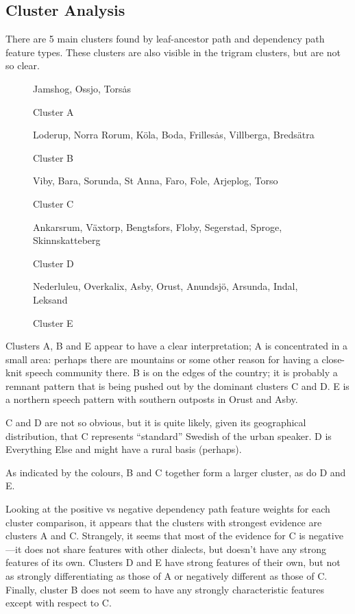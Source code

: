 \subsection{Cluster Analysis}

There are 5 main clusters found by leaf-ancestor path and dependency
path feature types. These clusters are also visible in the trigram
clusters, but are not so clear.

\begin{figure}
  Jamshog, Ossjo, Tors\.as
\label{cluster-a}
\caption{Cluster A}
\end{figure}

\begin{figure}
  Loderup, Norra Rorum, K\"ola, Boda, Frilles\.as, Villberga,
  Breds\"atra
\label{cluster-b}
\caption{Cluster B}
\end{figure}

\begin{figure}
  Viby, Bara, Sorunda, St Anna, Faro, Fole, Arjeplog, Torso
\label{cluster-c}
\caption{Cluster C}
\end{figure}

\begin{figure}
  Ankarsrum, V\"axtorp, Bengtsfors, Floby, Segerstad, Sproge,
  Skinnskatteberg
\label{cluster-d}
\caption{Cluster D}
\end{figure}

\begin{figure}
  Nederluleu, Overkalix, Asby, Orust, Anundsj\"o, Arsunda, Indal,
  Leksand
\label{cluster-e}
\caption{Cluster E}
\end{figure}

Clusters A, B and E appear to have a clear interpretation; A is
concentrated in a small area: perhaps there are mountains or some
other reason for having a close-knit speech community there. B is on
the edges of the country; it is probably a remnant pattern that is
being pushed out by the dominant clusters C and D. E is a
northern speech pattern with southern outposts in Orust and Asby.

C and D are not so obvious, but it is quite likely, given its
geographical distribution, that C represents
``standard'' Swedish of the urban speaker. D is Everything Else and
might have a rural basis (perhaps).

As indicated by the colours, B and C together form a larger cluster,
as do D and E.

Looking at the positive vs negative dependency path feature weights
for each cluster comparison, it appears that the clusters with
strongest evidence are clusters A and C. Strangely, it seems that most
of the evidence for C is negative---it does not share features with
other dialects, but doesn't have any strong features of its own.
Clusters D and E have strong features of their own, but not as
strongly differentiating as those of A or negatively different as
those of C. Finally, cluster B does not seem to have any strongly
characteristic features except with respect to C.

